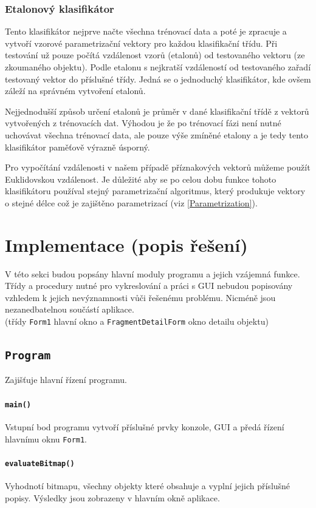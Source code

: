 \documentclass[12pt]{article}
\begin{document}
\subsubsection{Etalonový klasifikátor}
Tento klasifikátor nejprve načte všechna trénovací data a poté je zpracuje a vytvoří vzorové parametrizační vektory pro každou klasifikační třídu. Při testování už pouze počítá vzdálenost vzorů (etalonů) od testovaného vektoru (ze zkoumaného objektu). Podle etalonu s nejkratší vzdáleností od testovaného zařadí testovaný vektor do příslušné třídy. Jedná se o jednoduchý klasifikátor, kde ovšem záleží na správném vytvoření etalonů.

Nejjednodušší způsob určení etalonů je průměr v dané klasifikační třídě z vektorů vytvořených z trénovacích dat. Výhodou je že po trénovací fázi není nutné uchovávat všechna trénovací data, ale pouze výše zmíněné etalony a je tedy tento klasifikátor paměťově výrazně úsporný.

Pro vypočítání vzdálenosti v našem případě příznakových vektorů můžeme použít Euklidovskou vzdálenost. Je důležité aby se po celou dobu funkce tohoto klasifikátoru používal stejný parametrizační algoritmus, který produkuje vektory o stejné délce což je zajištěno parametrizací (viz \ref{Parametrization}).

\pagebreak
\section{Implementace (popis řešení)}
V této sekci budou popsány hlavní moduly programu a jejich vzájemná funkce. Třídy a procedury nutné pro vykreslování a práci s GUI nebudou popisovány vzhledem k jejich nevýznamnosti vůči řešenému problému. Nicméně jsou nezanedbatelnou součástí aplikace.
\\(třídy \texttt{Form1} hlavní okno a \texttt{FragmentDetailForm} okno detailu objektu)

\subsection{\texttt{Program}}
Zajišťuje hlavní řízení programu.
\paragraph{\texttt{main()}}
Vstupní bod programu vytvoří příslušné prvky konzole, GUI a předá řízení hlavnímu oknu \texttt{Form1}.
\paragraph{\texttt{evaluateBitmap()}}
Vyhodnotí bitmapu, všechny objekty které obsahuje a vyplní jejich příslušné popisy. Výsledky jsou zobrazeny v hlavním okně aplikace.
\end{document}
